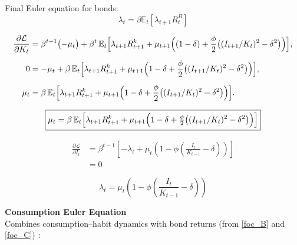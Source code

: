 \documentclass[11pt,preprint]{elsarticle}
\numberwithin{equation}{section}
\numberwithin{figure}{section}
\numberwithin{table}{section}
\begin{document}
Final Euler equation for bonds: \begin{equation}\label{foc_B}
\boxed{\lambda_t = \beta \mathbb{E}_t\left[\lambda_{t+1}R^B_t\right]}
\end{equation}

\begin{align*}
\frac{\partial \mathcal{L}}{\partial K_t}
&= \beta^{t-1}\bigl(-\mu_t\bigr)
  + \beta^t\,\mathbb{E}_t\Bigl[
      \lambda_{t+1}R^k_{t+1}
    + \mu_{t+1}\Bigl(
        (1-\delta)
      + \frac{\phi}{2}\bigl((I_{t+1}/K_t)^2 - \delta^2\bigr)
    \Bigr)
  \Bigr], \\[1ex]
0
&= -\mu_t
  + \beta\,\mathbb{E}_t\Bigl[
      \lambda_{t+1}R^k_{t+1}
    + \mu_{t+1}\Bigl(
        1-\delta
      + \frac{\phi}{2}\bigl((I_{t+1}/K_t)^2 - \delta^2\bigr)
    \Bigr)
  \Bigr], \\[1ex]
\mu_t
&= \beta\,\mathbb{E}_t\Bigl[
      \lambda_{t+1}R^k_{t+1}
    + \mu_{t+1}\Bigl(
        1-\delta
      + \frac{\phi}{2}\bigl((I_{t+1}/K_t)^2 - \delta^2\bigr)
    \Bigr)
  \Bigr].
\end{align*}

\begin{equation}\label{foc_K}
  \boxed{%
    \mu_t
    = \beta\,\mathbb{E}_t\Bigl[
        \lambda_{t+1}R^k_{t+1}
      + \mu_{t+1}\Bigl(
          1-\delta
        + \tfrac{\phi}{2}\bigl((I_{t+1}/K_t)^2 - \delta^2\bigr)
      \Bigr)
    \Bigr]
  }
\end{equation}

\begin{align*}
\frac{\partial \mathcal{L}}{\partial I_t}
&= \beta^{t-1} \left[ 
   -\lambda_t 
   + \mu_t \left( 
        1 
        - \phi \left( \frac{I_t}{K_{t-1}} - \delta \right) 
     \right)
\right] \\
&= 0
\end{align*}

\begin{equation}\label{foc_I}
\boxed{
  \lambda_t 
  = \mu_t 
    \left( 1 
      - \phi 
        \left( \frac{I_t}{K_{t-1}} - \delta \right)
    \right)
}
\end{equation}

\newpage

\textbf{Consumption Euler Equation}\\
Combines consumption--habit dynamics with bond returns (from
\eqref{foc_B} and \eqref{foc_C}) :
\end{document}
